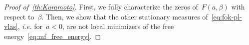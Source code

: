 \documentclass[onefignum,onetabnum]{siamart251216} %
\renewcommand{\geq}{\geqslant}
\newcommand{\rg}[1]{\textcolor{rose}{\rm{[RG : #1]}}}
\theoremstyle{plain}
\numberwithin{equation}{section}
\numberwithin{theorem}{section}
\begin{document}
\begin{proof}[Proof of~{\cref{th:Kuramoto}}]


        First, we fully characterize the zeros of~$F(a,\beta)$ with respect to~$\beta$.
        Then, we show that the other stationary measures of~\eqref{eq:fok-pl-vlas}, \textit{i.e.} for~$a<0$, are not local minimizers of the free energy~\eqref{eq:mf_free_energy}.

    

\end{proof}
\end{document}
